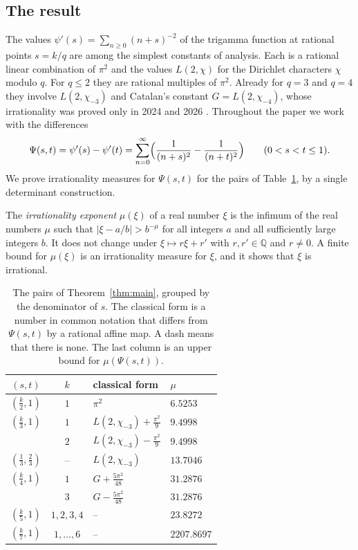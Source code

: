 \documentclass[11pt]{amsart}
\theoremstyle{definition}
\theoremstyle{remark}
\numberwithin{equation}{section}
\newcommand{\Q}{\mathbb Q}
\newcommand{\MuLamU}{31.2876}
\newcommand{\MuThirdsU}{9.4998}
\newcommand{\MuFifthsU}{23.8272}
\newcommand{\MuSeventhsU}{2207.8697}
\newcommand{\MuChi}{13.7046}
\newcommand{\MuHalvesU}{6.5253}
\begin{document}
\subsection{The result}
The values $\psi'(s)=\sum_{n\ge0}(n+s)^{-2}$ of the trigamma function at rational points $s=k/q$ are among the
simplest constants of analysis. Each is a rational linear combination of $\pi^2$ and the values $L(2,\chi)$ for the
Dirichlet characters $\chi$ modulo $q$. For $q\le2$ they are rational multiples of $\pi^2$. Already for $q=3$ and
$q=4$ they involve $L(2,\chi_{-3})$ and Catalan's constant $G=L(2,\chi_{-4})$, whose irrationality was proved only in
2024 and 2026 \cite{CDT2024,OpenAI2026}. Throughout the paper we work with the differences
\[
 \Psi(s,t)=\psi'(s)-\psi'(t)=\sum_{n=0}^\infty\Bigl(\frac1{(n+s)^2}-\frac1{(n+t)^2}\Bigr)\qquad(0<s<t\le1).
\]
We prove irrationality measures for $\Psi(s,t)$ for the pairs of Table~\ref{tab:main}, by a single determinant
construction.

The \emph{irrationality exponent} $\mu(\xi)$ of a real number $\xi$ is the infimum of the real numbers $\mu$ such that
$|\xi-a/b|>b^{-\mu}$ for all integers $a$ and all sufficiently large integers $b$. It does not change under
$\xi\mapsto r\xi+r'$ with $r,r'\in\Q$ and $r\ne0$. A finite bound for $\mu(\xi)$ is an irrationality measure for
$\xi$, and it shows that $\xi$ is irrational.

\begin{table}[ht]
\centering
\begin{tabular}{@{}ccll@{}}
\toprule
$(s,t)$ & $k$ & classical form & $\mu$ \\
\midrule
$(\frac k2,1)$ & $1$ & $\pi^2$ & $\MuHalvesU$ \\
\addlinespace
$(\frac k3,1)$ & $1$ & $L(2,\chi_{-3})+\frac{\pi^2}9$ & $\MuThirdsU$ \\
& $2$ & $L(2,\chi_{-3})-\frac{\pi^2}9$ & $\MuThirdsU$ \\
$(\frac13,\frac23)$ & -- & $L(2,\chi_{-3})$ & $\MuChi$ \\
\addlinespace
$(\frac k4,1)$ & $1$ & $G+\frac{5\pi^2}{48}$ & $\MuLamU$ \\
& $3$ & $G-\frac{5\pi^2}{48}$ & $\MuLamU$ \\
\addlinespace
$(\frac k5,1)$ & $1,2,3,4$ & -- & $\MuFifthsU$ \\
\addlinespace
$(\frac k7,1)$ & $1,\dots,6$ & -- & $\MuSeventhsU$ \\
\bottomrule
\end{tabular}
\caption{The pairs of Theorem~\ref{thm:main}, grouped by the denominator of $s$. The classical form is a number in
common notation that differs from $\Psi(s,t)$ by a rational affine map. A dash means that there is none. The last column is an upper bound for $\mu(\Psi(s,t))$.}\label{tab:main}
\end{table}
\end{document}
